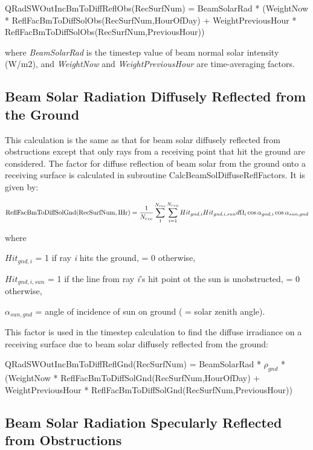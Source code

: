 QRadSWOutIncBmToDiffReflObs(RecSurfNum) = BeamSolarRad * (WeightNow * ReflFacBmToDiffSolObs(RecSurfNum,HourOfDay) + WeightPreviousHour * ReflFacBmToDiffSolObs(RecSurfNum,PreviousHour))

where \emph{BeamSolarRad} is the timestep value of beam normal solar intensity (W/m2), and \emph{WeightNow} and \emph{WeightPreviousHour} are time-averaging factors.

\subsection{Beam Solar Radiation Diffusely Reflected from the Ground}\label{beam-solar-radiation-diffusely-reflected-from-the-ground}

This calculation is the same as that for beam solar diffusely reflected from obstructions except that only rays from a receiving point that hit the ground are considered. The factor for diffuse reflection of beam solar from the ground onto a receiving surface is calculated in subroutine CalcBeamSolDiffuseReflFactors. It is given by:

\begin{equation}
{\rm{ReflFacBmToDiffSolGnd(RecSurfNum,IHr)}} = \frac{1}{{{N_{rec}}}}\sum\limits_1^{{N_{rec}}} {\sum\limits_{i = 1}^{{N_{ray}}} {Hi{t_{gnd,i}}Hi{t_{gnd,i,sun}}d{\Omega_i}\cos {\alpha_{gnd,i}}\cos {\alpha_{sun,gnd}}} }
\end{equation}

where

\(Hi{t_{gnd,i}}\) = 1 if ray \emph{i} hits the ground, = 0 otherwise,

\(Hi{t_{gnd,i,sun}}\) = 1 if the line from ray \emph{i}'s hit point ot the sun is unobstructed, = 0 otherwise,

\({\alpha_{sun,gnd}}\) = angle of incidence of sun on ground ( = solar zenith angle).

This factor is used in the timestep calculation to find the diffuse irradiance on a receiving surface due to beam solar diffusely reflected from the ground:

QRadSWOutIncBmToDiffReflGnd(RecSurfNum) = BeamSolarRad * \({\rho_{gnd}}\) * (WeightNow * ReflFacBmToDiffSolGnd(RecSurfNum,HourOfDay) + WeightPreviousHour * ReflFacBmToDiffSolGnd(RecSurfNum,PreviousHour))

\subsection{Beam Solar Radiation Specularly Reflected from Obstructions}\label{beam-solar-radiation-specularly-reflected-from-obstructions}

